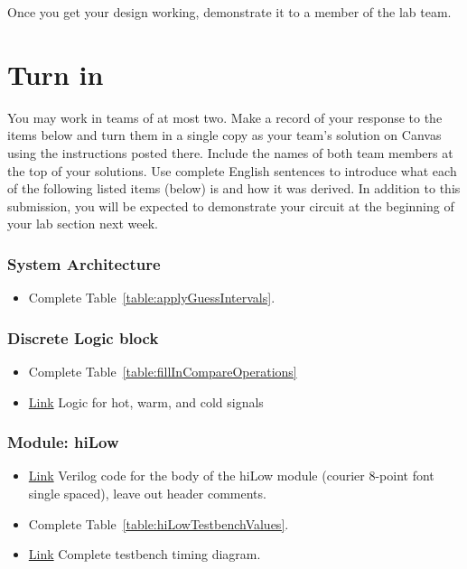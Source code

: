 Once you get your design working, demonstrate it to a member of the 
lab team.  


\section{Turn in}

You may work in teams of at most two. Make a record of your response to
the items below and turn them in a single copy as your team's solution
on Canvas using the instructions posted there. Include the names of both
team members at the top of your solutions. Use complete English
sentences to introduce what each of the following listed items (below)
is and how it was derived. In addition to this submission, you will be
expected to demonstrate your circuit at the beginning of your lab
section next week.

\subsubsection{System Architecture}
\begin{itemize}
\item Complete Table~\ref{table:applyGuessIntervals}.
\end{itemize}

\subsubsection{Discrete Logic block}
\begin{itemize}
\item Complete Table~\ref{table:fillInCompareOperations}

\item \protect\hyperlink{hotWarmCold_Logic}{Link} Logic for hot, warm, and cold signals
\end{itemize}


\subsubsection{Module: hiLow}

\begin{itemize}
\item
  \protect\hyperlink{hilow-module}{Link} Verilog code for the body of
  the hiLow module (courier 8-point font single spaced), leave out
  header comments.
\item  Complete Table~\ref{table:hiLowTestbenchValues}.
\item  \protect\hyperlink{hilow_tb-module}{Link}  Complete testbench timing diagram.
\end{itemize}

